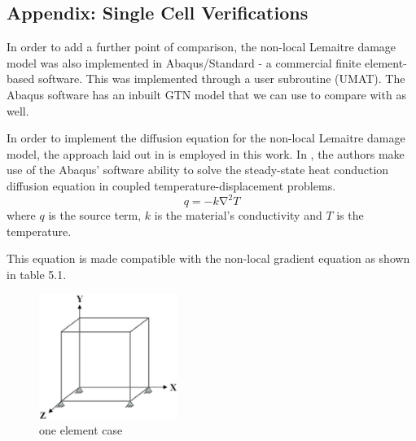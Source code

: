 \documentclass[sn-mathphys,Numbered,draft]{sn-jnl}%
\begin{document}
\begin{appendices}

\section{Appendix: Single Cell Verifications} \label{app:one_cell}

In order to add a further point of comparison, the non-local Lemaitre damage model was also implemented in Abaqus/Standard - a commercial finite element-based software. This was implemented through a user subroutine (UMAT). The Abaqus software has an inbuilt GTN model that we can use to compare with as well.

In order to implement the diffusion equation for the non-local Lemaitre damage model, the approach laid out in \citet{azinpour_simple_2018} is employed in this work. In \citet{azinpour_simple_2018}, the authors make use of the Abaqus' software ability to solve the steady-state heat conduction diffusion equation in coupled temperature-displacement problems. 
\begin{equation}
    q=-k\mathrm{\nabla}^2T
\end{equation}
where $q$ is the source term, $k$ is the material's conductivity and  $T$ is the temperature.

This equation is made compatible with the non-local gradient equation as shown in table 5.1.

\begin{table}[ht]
	\centering
{}
	\caption{Analogous set-up of the heat equation and non-local gradient equation}
	\label{tab:diffusion_equation_comparison}
\end{table}



\begin{figure}[htb]
\begin{center}
	\includegraphics[width=0.4\textwidth]{./figures/finiteVolumeImplementation/cubeCase.png}
\caption{one element case}
\label{fig:deforming body}
\end{center}
\end{figure}


\end{appendices}
\end{document}
